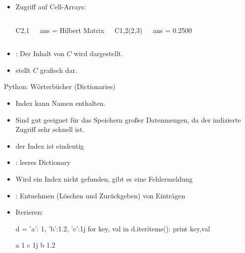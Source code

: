 \documentclass[hyperref={xetex}]{beamer}
\begin{document}
%
%
\begin{frame}[fragile]{}
\begin{itemize}
\item Zugriff auf Cell-Arrays:\\ 
\begin{columns}[c]
\begin{matlabin} 
C{2,1}
\end{matlabin}
\begin{matlab}
ans =
Hilbert Matrix
\end{matlab}
\begin{matlabin}
C{1,2}(2,3)
\end{matlabin}
\begin{matlab}
ans =
    0.2500
\end{matlab}
\end{columns}
\item {}: Der Inhalt von $C$ wird dargestellt.
\item {} stellt $C$ grafisch dar.
\end{itemize}
\end{frame}

\begin{frame}[fragile]{Python: Wörterbücher (Dictionaries)}
\begin{itemize}
\item Index kann Namen enthalten.
\item Sind gut geeignet für das Speichern großer Datenmengen, da der indizierte Zugriff sehr schnell ist. 
\item der Index ist eindeutig
\item {}: leeres Dictionary
\item Wird ein Index nicht gefunden, gibt es eine Fehlermeldung
\item {}: Entnehmen (Löschen und Zurückgeben) von Einträgen 
\item Iterieren:
\begin{pyin}
d = {'a': 1, 'b':1.2, 'c':1j}
for key, val in d.iteritems():
  print key,val        
\end{pyin}
\begin{pyout}
a 1
c 1j
b 1.2
\end{pyout}
\end{itemize}
\end{frame}
\end{document}
